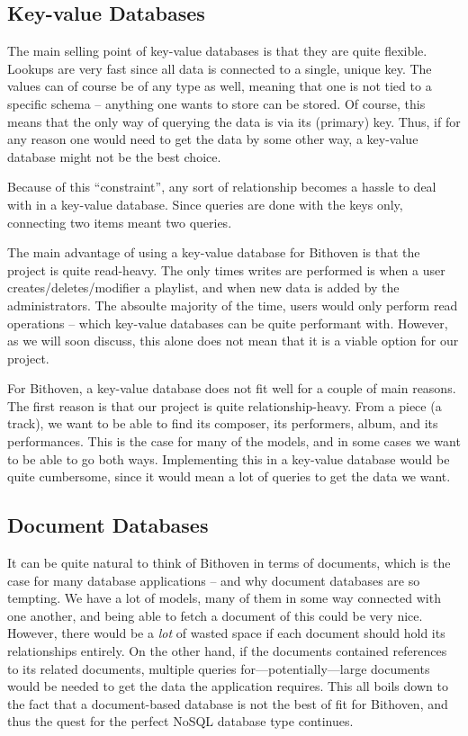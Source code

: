 \subsection{Key-value Databases}
\label{analysis-kv-db}
The main selling point of key-value databases is that they are quite flexible.
Lookups are very fast since all data is connected to a single, unique key. The
values can of course be of any type as well, meaning that one is not tied to a
specific schema -- anything one wants to store can be stored. Of course, this
means that the only way of querying the data is via its (primary) key. Thus, if
for any reason one would need to get the data by some other way, a key-value
database might not be the best choice.

Because of this ``constraint'', any sort of relationship becomes a hassle to
deal with in a key-value database. Since queries are done with the keys only,
connecting two items meant two queries.

The main advantage of using a key-value database for Bithoven is that the
project is quite read-heavy. The only times writes are performed is when a user
creates/deletes/modifier a playlist, and when new data is added by the
administrators. The absoulte majority of the time, users would only perform read
operations -- which key-value databases can be quite performant with. However,
as we will soon discuss, this alone does not mean that it is a viable option for
our project.

For Bithoven, a key-value database does not fit well for a couple of main
reasons. The first reason is that our project is quite relationship-heavy. From
a piece (a track), we want to be able to find its composer, its performers,
album, and its performances. This is the case for many of the models, and in
some cases we want to be able to go both ways. Implementing this in a key-value
database would be quite cumbersome, since it would mean a lot of queries to get
the data we want.

\subsection{Document Databases}
\label{analysis-doc-db}

It can be quite natural to think of Bithoven in terms of documents, which is the
case for many database applications -- and why document databases are so
tempting. We have a lot of models, many of them in some way connected with one
another, and being able to fetch a document of this could be very nice. However,
there would be a \emph{lot} of wasted space if each document should hold its
relationships entirely. On the other hand, if the documents contained references
to its related documents, multiple queries for---potentially---large documents
would be needed to get the data the application requires. This all boils down to
the fact that a document-based database is not the best of fit for Bithoven, and
thus the quest for the perfect NoSQL database type continues.

